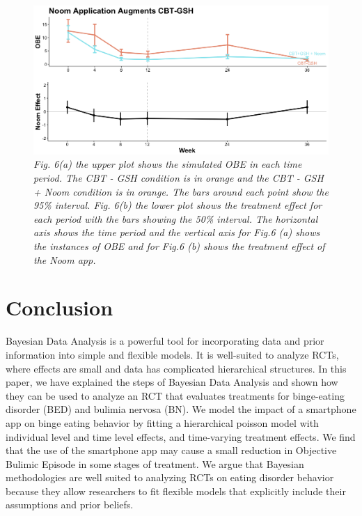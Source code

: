 \documentclass{article}
\begin{document}
\begin{figure}[H]
\begin{center}
\includegraphics[width=\textwidth, height=\textheight, keepaspectratio]{noom_effect.png}
\caption{\emph{Fig. 6(a) the upper plot shows the simulated OBE in each time period. The CBT - GSH condition is in orange and the CBT - GSH + Noom condition is in orange. The bars around each point show the 95\% interval. Fig. 6(b) the lower plot shows the treatment effect for each period with the bars showing the 50\% interval. The horizontal axis shows the time period and the vertical axis for Fig.6 (a) shows the instances of OBE and for Fig.6 (b) shows the treatment effect of the Noom app.}}
\end{center}
\end{figure}

\section{Conclusion}
Bayesian Data Analysis is a powerful tool for incorporating data and prior information into simple and flexible models.  It is well-suited to analyze RCTs, where effects are small and data has complicated hierarchical structures.  In this paper, we have explained the steps of Bayesian Data Analysis and shown how they can be used to analyze an RCT that evaluates treatments for binge-eating disorder (BED) and bulimia nervosa (BN).  We model the impact of a smartphone app on binge eating behavior by fitting a hierarchical poisson model with individual level and time level effects, and time-varying treatment effects.  We find that the use of the smartphone app may cause a small reduction in Objective Bulimic Episode in some stages of treatment.  We argue that Bayesian methodologies are well suited to analyzing RCTs on eating disorder behavior because they allow researchers to fit flexible models that explicitly include their assumptions and prior beliefs.
\end{document}
